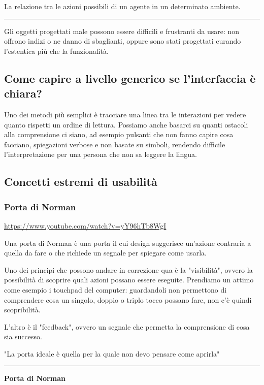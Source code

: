 \documentclass[11pt,a4paper]{book}
\begin{document}
La relazione tra le azioni possibili di un agente in un determinato ambiente.

\noindent\rule{\textwidth}{1pt}

Gli oggetti progettati male possono essere difficili e frustranti da usare: non offrono indizi o ne danno di sbaglianti, oppure sono stati progettati curando l'estentica più che la funzionalità.

\subsection{Come capire a livello generico se l'interfaccia è chiara?}
Uno dei metodi più semplici è tracciare una linea tra le interazioni per vedere quanto rispetti un ordine di lettura. Possiamo anche basarci su quanti ostacoli alla comprensione ci siano, ad esempio pulsanti che non fanno capire cosa facciano, spiegazioni verbose e non basate su simboli, rendendo difficile l'interpretazione per una persona che non sa leggere la lingua. 

\subsection{Concetti estremi di usabilità}
\subsubsection{Porta di Norman}
\href{It's not you. Bad doors are everywhere.}{https://www.youtube.com/watch?v=yY96hTb8WgI}

Una porta di Norman è una porta il cui design suggerisce un'azione contraria a quella da fare o che richiede un segnale per spiegare come usarla.

Uno dei principi che possono andare in correzione qua è la "visibilità", ovvero la possibilità di scoprire quali azioni possano essere eseguite. Prendiamo un attimo come esempio i touchpad del computer: guardandoli non permettono di comprendere cosa un singolo, doppio o triplo tocco possano fare, non c'è quindi scopribilità.

L'altro è il "feedback", ovvero un segnale che permetta la comprensione di cosa sia successo.

"La porta ideale è quella per la quale non devo pensare come aprirla"


\noindent\rule{\textwidth}{1pt}
\begin{center}
	\textbf{Porta di Norman}
\end{center}
\end{document}
